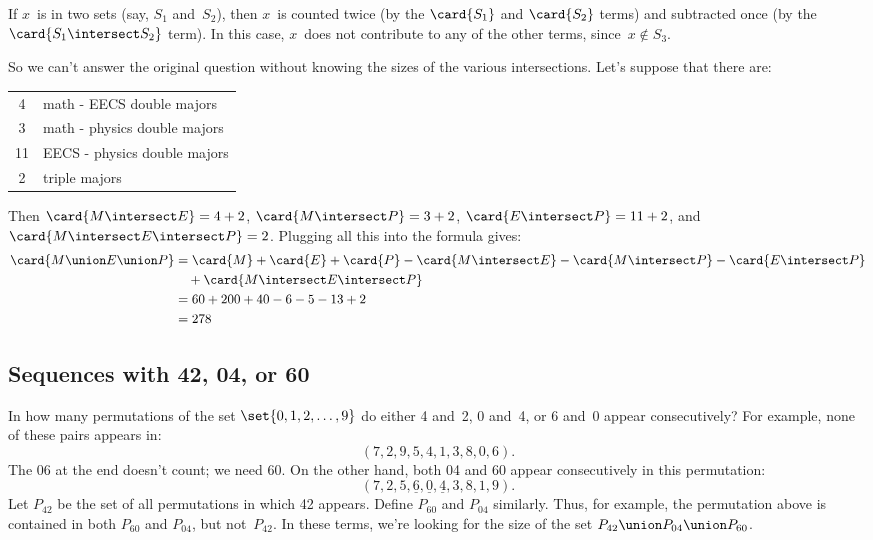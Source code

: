 If $x$~is in two sets (say, $S_1$ and~$S_2$), then $x$~is counted
twice (by the $\card{S_1}$ and $\card{S_2}$ terms) and subtracted once
(by the $\card{S_1 \intersect S_2}$ term).  In this case, $x$~does not
contribute to any of the other terms, since~$x \notin S_3$.

So we can't answer the original question without knowing the sizes of
the various intersections.  Let's suppose that there are:
%
\begin{center}
\begin{tabular}{cl}
4 & math - EECS double majors \\
3 & math - physics double majors \\
11 & EECS - physics double majors \\
2 & triple majors
\end{tabular}
\end{center}
%
Then $\card{M \intersect E} = 4 + 2$, $\card{M \intersect P} = 3 + 2$, $\card{E
\intersect P} = 11 + 2$, and $\card{M \intersect E \intersect P} = 2$.  Plugging all this
into the formula gives:
%
\begin{align*}
\card{M \union E \union P}
    & = \card{M} + \card{E} + \card{P}
       - \card{M \intersect E} - \card{M \intersect P} - \card{E \intersect P}\\
    &\quad  + \card{M \intersect E \intersect P} \\
    & = 60 + 200 + 40 - 6 - 5 - 13 + 2 \\
    & = 278
\end{align*}

\subsection{Sequences with 42, 04, or 60}

In how many permutations of the set $\set{0, 1, 2, \dots, 9}$ do
either 4 and~2, 0 and~4, or 6 and~0 appear consecutively?  For
example, none of these pairs appears in:
%
\[
(7, 2, 9, 5, 4, 1, 3, 8, 0, 6).
\]
%
The 06 at the end doesn't count; we need 60.  On the other hand, both
04 and 60 appear consecutively in this permutation:
%
\[
(7, 2, 5, \underline{6}, \underline{0}, \underline{4}, 3, 8, 1, 9).
\]
%
Let $P_{42}$ be the set of all permutations in which 42 appears.
Define $P_{60}$ and $P_{04}$ similarly.  Thus, for example, the
permutation above is contained in both $P_{60}$ and $P_{04}$, but
not~$P_{42}$.  In these terms, we're looking for the size of the set
$P_{42} \union P_{04} \union P_{60}$.


